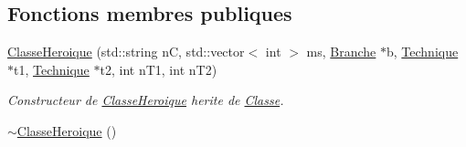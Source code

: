 \subsection*{Fonctions membres publiques}
\begin{DoxyCompactItemize}
\item 
\hyperlink{classClasseHeroique_a94be4fc3d32f2792f8c624ba8ec6911c}{Classe\-Heroique} (std\-::string n\-C, std\-::vector$<$ int $>$ ms, \hyperlink{classBranche}{Branche} $\ast$b, \hyperlink{classTechnique}{Technique} $\ast$t1, \hyperlink{classTechnique}{Technique} $\ast$t2, int n\-T1, int n\-T2)
\begin{DoxyCompactList}\small\item\em Constructeur de \hyperlink{classClasseHeroique}{Classe\-Heroique} herite de \hyperlink{classClasse}{Classe}. \end{DoxyCompactList}\item 
\hypertarget{classClasseHeroique_ad48bcf5829fc43e313376813f32a4170}{\hyperlink{classClasseHeroique_ad48bcf5829fc43e313376813f32a4170}{$\sim$\-Classe\-Heroique} ()}\label{classClasseHeroique_ad48bcf5829fc43e313376813f32a4170}


\end{DoxyCompactItemize}
